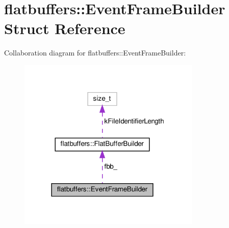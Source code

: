 \hypertarget{structflatbuffers_1_1EventFrameBuilder}{}\section{flatbuffers\+:\+:Event\+Frame\+Builder Struct Reference}
\label{structflatbuffers_1_1EventFrameBuilder}


Collaboration diagram for flatbuffers\+:\+:Event\+Frame\+Builder\+:
\nopagebreak
\begin{figure}[H]
\begin{center}
\leavevmode
\includegraphics[width=246pt]{structflatbuffers_1_1EventFrameBuilder__coll__graph}
\end{center}
\end{figure}
